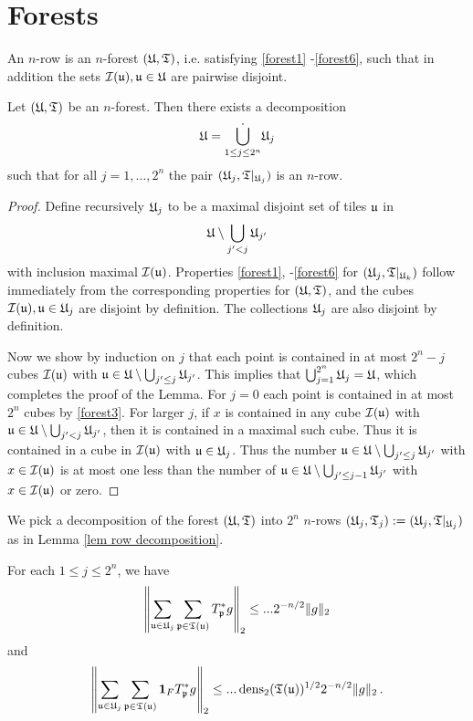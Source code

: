 \section{Forests}
An $n$-row is an $n$-forest $(\mathfrak U, \mathfrak T)$, i.e. satisfying \eqref{forest1} -\eqref{forest6}, such that in addition the sets $\mathcal{I}(\mathfrak u), \mathfrak u \in \mathfrak U$ are pairwise disjoint.

\begin{lemma}
    \label{lem row decomposition}
    Let $(\mathfrak U, \mathfrak T)$ be an $n$-forest. Then there exists a decomposition
    $$
        \mathfrak U = \dot{\bigcup_{1 \le j \le 2^n}} \mathfrak U_j
    $$
    such that for all $j = 1, \dotsc, 2^n$ the pair $(\mathfrak U_j, \mathfrak T|_{\mathfrak U_j})$ is an $n$-row.
\end{lemma}

\begin{proof}
    Define recursively $\mathfrak U_j$ to be a maximal disjoint set of tiles $\mathfrak u$ in
    $$
        \mathfrak U \setminus \bigcup_{j' < j} \mathfrak U_{j'}
    $$
    with inclusion maximal $\mathcal{I}(\mathfrak u)$. Properties \eqref{forest1}, -\eqref{forest6} for $(\mathfrak U_j, \mathfrak T|_{\mathfrak U_k})$ follow immediately from the corresponding properties for $(\mathfrak U, \mathfrak T)$, and the cubes $\mathcal{I}(\mathfrak u), \mathfrak u \in \mathfrak U_j$ are disjoint by definition. The collections $\mathfrak U_j$ are also disjoint by definition.

    Now we show by induction on $j$ that each point is contained in at most $2^n - j$ cubes $\mathcal{I}(\mathfrak u)$ with $\mathfrak u \in \mathfrak U \setminus \bigcup_{j' \le j} \mathfrak U_{j'}$. This implies that $\bigcup_{j = 1}^{2^n} \mathfrak U_j = \mathfrak U$, which completes the proof of the Lemma. For $j = 0$ each point is contained in at most $2^n$ cubes by \eqref{forest3}. For larger $j$, if $x$ is contained in any cube $\mathcal{I}(\mathfrak u)$ with $\mathfrak u \in \mathfrak U \setminus \bigcup_{j' < j} \mathfrak U_{j'}$, then it is contained in a maximal such cube. Thus it is contained in a cube in $\mathcal{I}(\mathfrak u)$ with $\mathfrak u \in \mathfrak U_j$. Thus the number $\mathfrak u \in \mathfrak U \setminus \bigcup_{j' \le j} \mathfrak U_{j'}$ with $x\in \mathcal{I}(\mathfrak u)$ is at most one less than the number of $\mathfrak u \in \mathfrak U \setminus \bigcup_{j' \le j-1} \mathfrak U_{j'}$ with $x \in \mathcal{I}(\mathfrak u)$ or zero.
\end{proof}

We pick a decomposition of the forest $(\mathfrak U, \mathfrak T)$ into $2^n$ $n$-rows $(\mathfrak U_j, \mathfrak T_j) := (\mathfrak U_j, \mathfrak T|_{\mathfrak U_j})$ as in Lemma \ref{lem row decomposition}.

\begin{lemma}
    \label{lem row bound}
    For each $1 \le j \le 2^n$, we have
    $$
        \left\| \sum_{\mathfrak u \in \mathfrak U_j} \sum_{\mathfrak p \in \mathfrak T(\mathfrak u)}  T_{\mathfrak p}^* g\right\|_2 \le ...  2^{-n/2} \|g\|_2
    $$
    and
    $$
        \left\| \sum_{\mathfrak u \in \mathfrak U_j} \sum_{\mathfrak p \in \mathfrak T(\mathfrak u)} \mathbf{1}_F T_{\mathfrak p}^* g\right\|_2 \le ... \operatorname{\operatorname{dens}}_2(\mathfrak T(\mathfrak u))^{1/2} 2^{-n/2} \|g\|_2\,.
    $$
\end{lemma}

